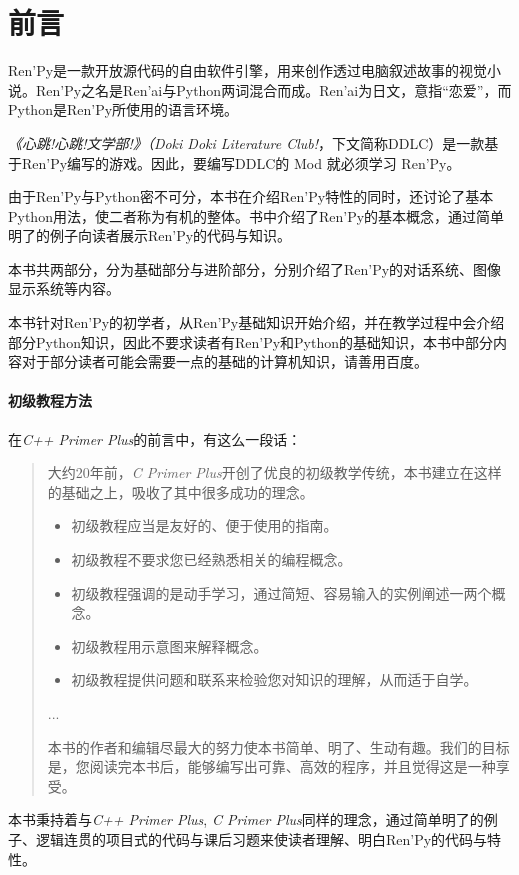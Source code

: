\documentclass[../Main.tex]{subfiles}
\begin{document}
\chapter*{前言}
Ren'Py是一款开放源代码的自由软件引擎，用来创作透过电脑叙述故事的视觉小说。Ren'Py之名是Ren'ai与Python两词混合而成。Ren'ai为日文，意指“恋爱”，而Python是Ren'Py所使用的语言环境。

{\itshape 《心跳!心跳!文学部!》（Doki Doki Literature Club!}，下文简称DDLC）是一款基于Ren'Py编写的游戏。因此，要编写DDLC的 Mod 就必须学习 Ren'Py。

由于Ren'Py与Python密不可分，本书在介绍Ren'Py特性的同时，还讨论了基本Python用法，使二者称为有机的整体。书中介绍了Ren'Py的基本概念，通过简单明了的例子向读者展示Ren'Py的代码与知识。

本书共两部分，分为基础部分与进阶部分，分别介绍了Ren'Py的对话系统、图像显示系统等内容。

本书针对Ren'Py的初学者，从Ren'Py基础知识开始介绍，并在教学过程中会介绍部分Python知识，因此不要求读者有Ren'Py和Python的基础知识，本书中部分内容对于部分读者可能会需要一点的基础的计算机知识，请善用百度。


\subsubsection*{初级教程方法}
在{\itshape C++ Primer Plus}的前言中，有这么一段话：
\begin{quotation}
    大约20年前，{\itshape C Primer Plus}开创了优良的初级教学传统，本书建立在这样的基础之上，吸收了其中很多成功的理念。
    \begin{itemize}
        \item 初级教程应当是友好的、便于使用的指南。
        \item 初级教程不要求您已经熟悉相关的编程概念。
        \item 初级教程强调的是动手学习，通过简短、容易输入的实例阐述一两个概念。
        \item 初级教程用示意图来解释概念。
        \item 初级教程提供问题和联系来检验您对知识的理解，从而适于自学。
    \end{itemize}
    ...

    本书的作者和编辑尽最大的努力使本书简单、明了、生动有趣。我们的目标是，您阅读完本书后，能够编写出可靠、高效的程序，并且觉得这是一种享受。
\end{quotation}
本书秉持着与{\itshape C++ Primer Plus}, {\itshape C Primer Plus}同样的理念，通过简单明了的例子、逻辑连贯的项目式的代码与课后习题来使读者理解、明白Ren'Py的代码与特性。
\end{document}
